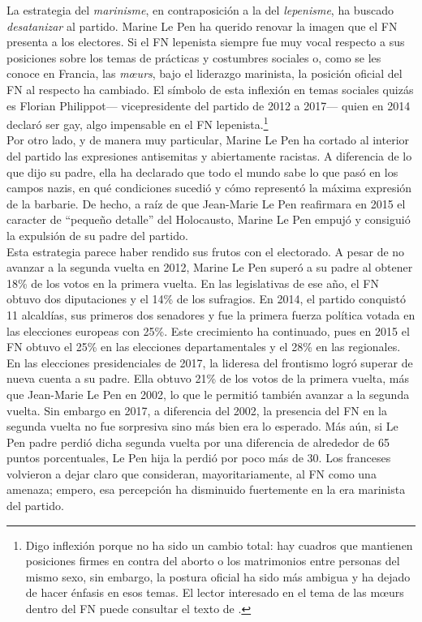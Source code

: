 La estrategia del \textit{marinisme}, en contraposición a la del \textit{lepenisme}, ha buscado \textit{desatanizar} al partido. Marine Le Pen ha querido renovar la imagen que el FN presenta a los electores. Si el FN lepenista siempre fue muy vocal respecto a sus posiciones sobre los temas de prácticas y costumbres sociales o, como se les conoce en Francia, las \textit{m\oe{}urs}, bajo el liderazgo marinista, la posición oficial del FN al respecto ha cambiado. El símbolo de esta inflexión en temas sociales quizás es Florian Philippot--- vicepresidente del partido de 2012 a 2017--- quien en 2014 declaró ser gay, algo impensable en el FN lepenista.\footnote{Digo inflexión porque no ha sido un cambio total: hay cuadros que mantienen posiciones firmes en contra del aborto o los matrimonios entre personas del mismo sexo, sin embargo, la postura oficial ha sido más ambigua y ha dejado de hacer énfasis en esos temas. El lector interesado en el tema de las m\oe{}urs dentro del FN puede consultar el texto de \textcite{Crepon15}.}\\ 

Por otro lado, y de manera muy particular, Marine Le Pen ha cortado al interior del partido las expresiones antisemitas y abiertamente racistas. A diferencia de lo que dijo su padre, ella ha declarado que todo el mundo sabe lo que pasó en los campos nazis, en qué condiciones sucedió y cómo representó la máxima expresión de la barbarie. De hecho, a raíz de que Jean-Marie Le Pen reafirmara en 2015 el caracter de ``pequeño detalle'' del Holocausto, Marine Le Pen empujó y consiguió la expulsión de su padre del partido.\\

Esta estrategia parece haber rendido sus frutos con el electorado. A pesar de no avanzar a la segunda vuelta en 2012, Marine Le Pen superó a su padre al obtener 18\% de los votos en la primera vuelta. En las legislativas de ese año, el FN obtuvo dos diputaciones y el 14\% de los sufragios. En 2014, el partido conquistó 11 alcaldías, sus primeros dos senadores y fue la primera fuerza política votada en las elecciones europeas con 25\%. Este crecimiento ha continuado, pues en 2015 el FN obtuvo el 25\% en las elecciones departamentales y el 28\% en las regionales.\\ 

En las elecciones presidenciales de 2017, la lideresa del frontismo logró superar de nueva cuenta a su padre. Ella obtuvo 21\% de los votos de la primera vuelta, más que Jean-Marie Le Pen en 2002, lo que le permitió también avanzar a la segunda vuelta. Sin embargo en 2017, a diferencia del 2002, la presencia del FN en la segunda vuelta no fue sorpresiva sino más bien era lo esperado. Más aún, si Le Pen padre perdió dicha segunda vuelta por una diferencia de alrededor de 65 puntos porcentuales, Le Pen hija la perdió por poco más de 30. Los franceses volvieron a dejar claro que consideran, mayoritariamente, al FN como una amenaza; empero, esa percepción ha disminuido fuertemente en la era marinista del partido.\\

